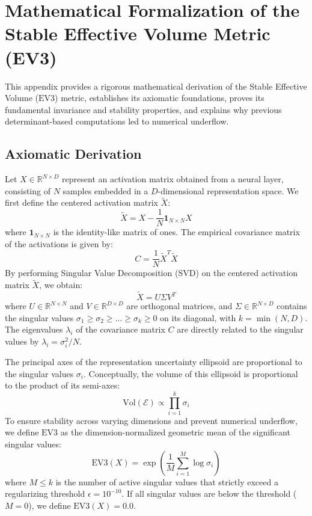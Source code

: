 \section{Mathematical Formalization of the Stable Effective Volume Metric (EV3)}
\label{app:ev3_formal}

This appendix provides a rigorous mathematical derivation of the Stable Effective Volume ($\text{EV3}$) metric, establishes its axiomatic foundations, proves its fundamental invariance and stability properties, and explains why previous determinant-based computations led to numerical underflow.

\subsection{Axiomatic Derivation}
Let $X \in \mathbb{R}^{N \times D}$ represent an activation matrix obtained from a neural layer, consisting of $N$ samples embedded in a $D$-dimensional representation space. We first define the centered activation matrix $\tilde{X}$:
\begin{equation}
\tilde{X} = X - \frac{1}{N} \mathbf{1}_{N \times N} X
\end{equation}
where $\mathbf{1}_{N \times N}$ is the identity-like matrix of ones. The empirical covariance matrix of the activations is given by:
\begin{equation}
C = \frac{1}{N} \tilde{X}^T \tilde{X}
\end{equation}
By performing Singular Value Decomposition (SVD) on the centered activation matrix $\tilde{X}$, we obtain:
\begin{equation}
\tilde{X} = U \Sigma V^T
\end{equation}
where $U \in \mathbb{R}^{N \times N}$ and $V \in \mathbb{R}^{D \times D}$ are orthogonal matrices, and $\Sigma \in \mathbb{R}^{N \times D}$ contains the singular values $\sigma_1 \ge \sigma_2 \ge \dots \ge \sigma_k \ge 0$ on its diagonal, with $k = \min(N, D)$. The eigenvalues $\lambda_i$ of the covariance matrix $C$ are directly related to the singular values by $\lambda_i = \sigma_i^2 / N$.

The principal axes of the representation uncertainty ellipsoid are proportional to the singular values $\sigma_i$. Conceptually, the volume of this ellipsoid is proportional to the product of its semi-axes:
\begin{equation}
\text{Vol}(\mathcal{E}) \propto \prod_{i=1}^k \sigma_i
\end{equation}
To ensure stability across varying dimensions and prevent numerical underflow, we define $\text{EV3}$ as the dimension-normalized geometric mean of the significant singular values:
\begin{equation}
\text{EV3}(X) = \exp \left( \frac{1}{M} \sum_{i=1}^M \log \sigma_i \right)
\end{equation}
where $M \le k$ is the number of active singular values that strictly exceed a regularizing threshold $\epsilon = 10^{-10}$. If all singular values are below the threshold ($M = 0$), we define $\text{EV3}(X) = 0.0$.

